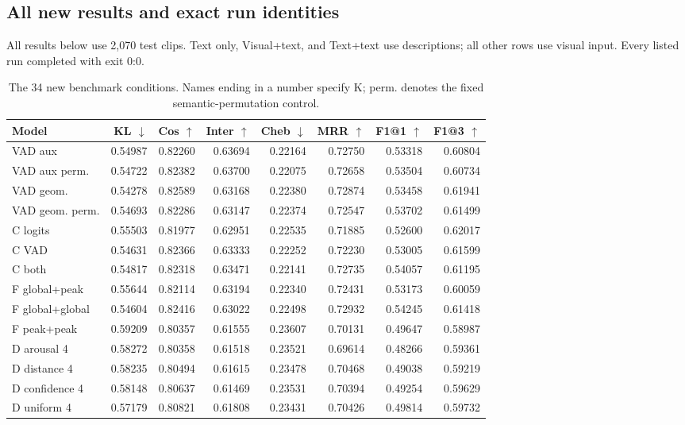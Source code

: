 \subsection{All new results and exact run identities}
All results below use 2,070 test clips. Text only, Visual+text, and Text+text use descriptions; all other rows use visual input. Every listed run completed with exit 0:0.
\begingroup\footnotesize\setlength{\tabcolsep}{4pt}
\begin{longtable}{lrrrrrrr}
\caption{The 34 new benchmark conditions. Names ending in a number specify K; perm. denotes the fixed semantic-permutation control.}\\
\toprule
Model & KL $\downarrow$ & Cos $\uparrow$ & Inter $\uparrow$ & Cheb $\downarrow$ & MRR $\uparrow$ & F1@1 $\uparrow$ & F1@3 $\uparrow$\\\midrule\endhead
VAD aux & 0.54987 & 0.82260 & 0.63694 & 0.22164 & 0.72750 & 0.53318 & 0.60804\\
VAD aux perm. & 0.54722 & 0.82382 & 0.63700 & 0.22075 & 0.72658 & 0.53504 & 0.60734\\
VAD geom. & 0.54278 & 0.82589 & 0.63168 & 0.22380 & 0.72874 & 0.53458 & 0.61941\\
VAD geom. perm. & 0.54693 & 0.82286 & 0.63147 & 0.22374 & 0.72547 & 0.53702 & 0.61499\\
C logits & 0.55503 & 0.81977 & 0.62951 & 0.22535 & 0.71885 & 0.52600 & 0.62017\\
C VAD & 0.54631 & 0.82366 & 0.63333 & 0.22252 & 0.72230 & 0.53005 & 0.61599\\
C both & 0.54817 & 0.82318 & 0.63471 & 0.22141 & 0.72735 & 0.54057 & 0.61195\\
F global+peak & 0.55644 & 0.82114 & 0.63194 & 0.22340 & 0.72431 & 0.53173 & 0.60059\\
F global+global & 0.54604 & 0.82416 & 0.63022 & 0.22498 & 0.72932 & 0.54245 & 0.61418\\
F peak+peak & 0.59209 & 0.80357 & 0.61555 & 0.23607 & 0.70131 & 0.49647 & 0.58987\\
D arousal 4 & 0.58272 & 0.80358 & 0.61518 & 0.23521 & 0.69614 & 0.48266 & 0.59361\\
D distance 4 & 0.58235 & 0.80494 & 0.61615 & 0.23478 & 0.70468 & 0.49038 & 0.59219\\
D confidence 4 & 0.58148 & 0.80637 & 0.61469 & 0.23531 & 0.70394 & 0.49254 & 0.59629\\
D uniform 4 & 0.57179 & 0.80821 & 0.61808 & 0.23431 & 0.70426 & 0.49814 & 0.59732\\

\end{longtable}
